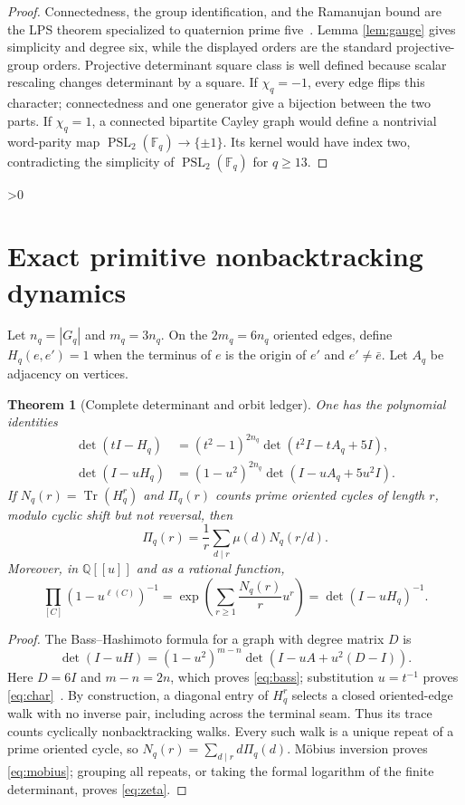 \documentclass[10pt]{article}
\providecommand{\CRevisionRound}{2}
\newtheorem{theorem}{Theorem}
\newcommand{\Fq}{\mathbb F_q}
\newcommand{\PSL}{\operatorname{PSL}}
\newcommand{\Tr}{\operatorname{Tr}}
\begin{document}
\begin{proof}
Connectedness, the group identification, and the Ramanujan bound are the
LPS theorem specialized to quaternion prime five~\cite{LPS}. Lemma
\ref{lem:gauge} gives simplicity and degree six, while the displayed orders
are the standard projective-group orders. Projective determinant square
class is well defined because scalar rescaling changes determinant by a
square. If $\chi_q=-1$, every edge flips this character; connectedness and
one generator give a bijection between the two parts. If $\chi_q=1$, a
connected bipartite Cayley graph would define a nontrivial word-parity map
$\PSL_2(\Fq)\to\{\pm1\}$. Its kernel would have index two, contradicting
the simplicity of $\PSL_2(\Fq)$ for $q\ge13$.
\end{proof}

\ifnum\CRevisionRound>0
\section{Exact primitive nonbacktracking dynamics}
Let $n_q=|G_q|$ and $m_q=3n_q$. On the $2m_q=6n_q$ oriented edges, define
$H_q(e,e')=1$ when the terminus of $e$ is the origin of $e'$ and
$e'\ne\bar e$. Let $A_q$ be adjacency on vertices.

\begin{theorem}[Complete determinant and orbit ledger]\label{thm:bass}
One has the polynomial identities
\begin{align}
 \det(tI-H_q)&=(t^2-1)^{2n_q}
 \det(t^2I-tA_q+5I),\label{eq:char}\\
 \det(I-uH_q)&=(1-u^2)^{2n_q}
 \det(I-uA_q+5u^2I).\label{eq:bass}
\end{align}
If $N_q(r)=\Tr(H_q^r)$ and $\Pi_q(r)$ counts prime oriented cycles of
length $r$, modulo cyclic shift but not reversal, then
\begin{equation}\label{eq:mobius}
 \Pi_q(r)=\frac1r\sum_{d\mid r}\mu(d)N_q(r/d).
\end{equation}
Moreover, in $\mathbb Q[[u]]$ and as a rational function,
\begin{equation}\label{eq:zeta}
 \prod_{[C]}(1-u^{\ell(C)})^{-1}
 =\exp\!\left(\sum_{r\ge1}\frac{N_q(r)}r u^r\right)
 =\det(I-uH_q)^{-1}.
\end{equation}
\end{theorem}

\begin{proof}
The Bass--Hashimoto formula for a graph with degree matrix $D$ is
\[
 \det(I-uH)=(1-u^2)^{m-n}\det(I-uA+u^2(D-I)).
\]
Here $D=6I$ and $m-n=2n$, which proves \eqref{eq:bass}; substitution
$u=t^{-1}$ proves \eqref{eq:char}~\cite{Hashimoto,Bass,KotaniSunada}.
By construction, a diagonal entry of $H_q^r$ selects a closed oriented-edge
walk with no inverse pair, including across the terminal seam. Thus its
trace counts cyclically nonbacktracking walks. Every such walk is a unique
repeat of a prime oriented cycle, so
$N_q(r)=\sum_{d\mid r}d\Pi_q(d)$. M\"obius inversion proves
\eqref{eq:mobius}; grouping all repeats, or taking the formal logarithm of
the finite determinant, proves \eqref{eq:zeta}.
\end{proof}
\fi
\end{document}
